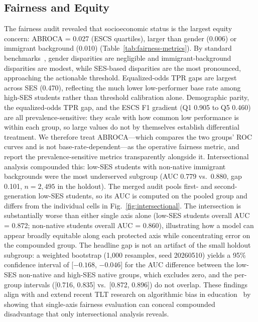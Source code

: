 \documentclass[journal]{IEEEtran}
\begin{document}
\subsection{Fairness and Equity}
The fairness audit revealed that socioeconomic status is the largest equity concern: ABROCA = 0.027 (ESCS quartiles), larger than gender (0.006) or immigrant background (0.010) (Table~\ref{tab:fairness-metrics}). By standard benchmarks~\cite{Gandara_2024_blackbox,Verger_2024_MADD}, gender disparities are negligible and immigrant-background disparities are modest, while SES-based disparities are the most pronounced, approaching the actionable threshold. Equalized-odds TPR gaps are largest across SES (0.470), reflecting the much lower low-performer base rate among high-SES students rather than threshold calibration alone. Demographic parity, the equalized-odds TPR gap, and the ESCS F1 gradient (Q1 0.905 to Q5 0.460) are all prevalence-sensitive: they scale with how common low performance is within each group, so large values do not by themselves establish differential treatment. We therefore treat ABROCA---which compares the two groups' ROC curves and is not base-rate-dependent---as the operative fairness metric, and report the prevalence-sensitive metrics transparently alongside it. Intersectional analysis compounded this: low-SES students with non-native immigrant backgrounds were the most underserved subgroup (AUC 0.779 vs.\ 0.880, gap 0.101, $n = 2{,}495$ in the holdout). The merged audit pools first- and second-generation low-SES students, so its AUC is computed on the pooled group and differs from the individual cells in Fig.~\ref{fig:intersectional}. The intersection is substantially worse than either single axis alone (low-SES students overall AUC = 0.872; non-native students overall AUC = 0.860), illustrating how a model can appear broadly equitable along each protected axis while concentrating error on the compounded group. The headline gap is not an artifact of the small holdout subgroup: a weighted bootstrap (1,000 resamples, seed 20260510) yields a 95\% confidence interval of [$-0.168$, $-0.046$] for the AUC difference between the low-SES non-native and high-SES native groups, which excludes zero, and the per-group intervals ([0.716, 0.835] vs.\ [0.872, 0.896]) do not overlap. These findings align with and extend recent TLT research on algorithmic bias in education~\cite{sha2022balancing,deho2024drift} by showing that single-axis fairness evaluation can conceal compounded disadvantage that only intersectional analysis reveals.
\end{document}
